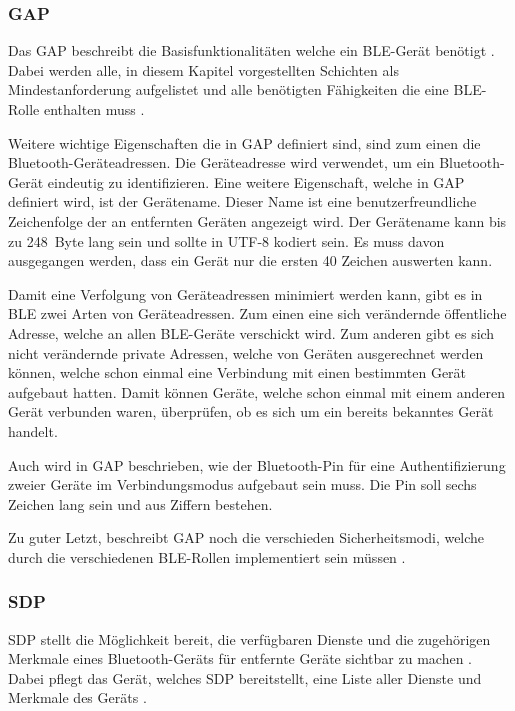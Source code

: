 \subsubsection{\acf{GAP}}
Das \acl{GAP} beschreibt die Basisfunktionalitäten welche ein \ac{BLE}-Gerät benötigt \cite[S.~207]{bluetoothCore}. Dabei werden alle, in diesem Kapitel vorgestellten Schichten als Mindestanforderung aufgelistet und alle benötigten Fähigkeiten die eine \ac{BLE}-Rolle enthalten muss \cite[S.~277f., S.~1241]{bluetoothCore}. 

Weitere wichtige Eigenschaften die in \ac{GAP} definiert sind, sind zum einen die Bluetooth-Geräteadressen. Die Geräteadresse wird verwendet, um ein Bluetooth-Gerät eindeutig zu identifizieren. Eine weitere Eigenschaft, welche in \ac{GAP} definiert wird, ist der Gerätename. Dieser Name ist eine benutzerfreundliche Zeichenfolge der an entfernten Geräten angezeigt wird. Der Gerätename kann bis zu 248~Byte lang sein und sollte in UTF-8 kodiert sein. Es muss davon ausgegangen werden, dass ein Gerät nur die ersten 40 Zeichen auswerten kann. \cite[S.~1251ff.]{bluetoothCore}

Damit eine Verfolgung von Geräteadressen minimiert werden kann, gibt es in \ac{BLE} zwei Arten von Geräteadressen. Zum einen eine sich verändernde öffentliche Adresse, welche an allen \ac{BLE}-Geräte verschickt wird. Zum anderen gibt es sich nicht verändernde private Adressen, welche von Geräten ausgerechnet werden können, welche schon einmal eine Verbindung mit einen bestimmten Gerät aufgebaut hatten. Damit können Geräte, welche schon einmal mit einem anderen Gerät verbunden waren, überprüfen, ob es sich um ein bereits bekanntes Gerät handelt. \cite[S.~19]{siliconBLE}

Auch wird in \ac{GAP} beschrieben, wie der Bluetooth-Pin für eine Authentifizierung zweier Geräte im Verbindungsmodus aufgebaut sein muss. Die Pin soll sechs Zeichen lang sein und aus Ziffern bestehen. \cite[S.~1253]{bluetoothCore}

Zu guter Letzt, beschreibt \ac{GAP} noch die verschieden Sicherheitsmodi, welche durch die verschiedenen \ac{BLE}-Rollen implementiert sein müssen \cite[S.~1337]{bluetoothCore}.

\subsubsection{\acf{SDP}}
\ac{SDP} stellt die Möglichkeit bereit, die verfügbaren Dienste und die zugehörigen Merkmale eines Bluetooth-Geräts für entfernte Geräte sichtbar zu machen \cite[S.~1173]{bluetoothCore}. Dabei pflegt das Gerät, welches \ac{SDP} bereitstellt, eine Liste aller Dienste und Merkmale des Geräts \cite[S.~1177]{bluetoothCore}.


